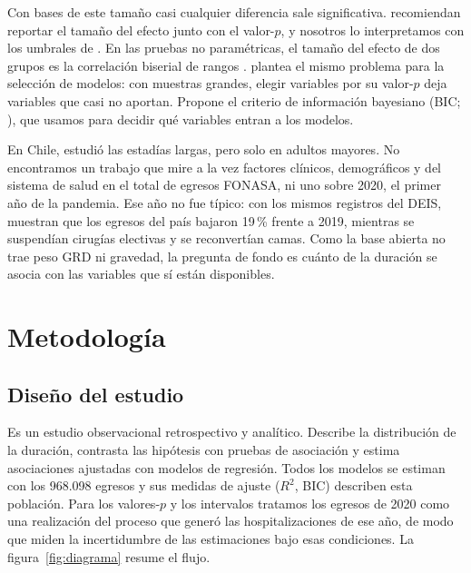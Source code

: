 \documentclass[10.5pt,a4paper,headings=small,abstract=false,bibliography=totoc,listof=totoc]{scrartcl}
\newcommand{\pct}{\,\%}
\begin{document}
Con bases de este tamaño casi cualquier diferencia sale significativa. \citet{lin2013} recomiendan reportar el tamaño del efecto junto con el valor-$p$, y nosotros lo interpretamos con los umbrales de \citet{cohen1988}. En las pruebas no paramétricas, el tamaño del efecto de dos grupos es la correlación biserial de rangos \citep{kerby2014}. \citet{raftery1995} plantea el mismo problema para la selección de modelos: con muestras grandes, elegir variables por su valor-$p$ deja variables que casi no aportan. Propone el criterio de información bayesiano (BIC; \citealt{schwarz1978}), que usamos para decidir qué variables entran a los modelos.

En Chile, \citet{olivares2020} estudió las estadías largas, pero solo en adultos mayores. No encontramos un trabajo que mire a la vez factores clínicos, demográficos y del sistema de salud en el total de egresos FONASA, ni uno sobre 2020, el primer año de la pandemia. Ese año no fue típico: con los mismos registros del DEIS, \citet{barahona2021} muestran que los egresos del país bajaron 19\pct{} frente a 2019, mientras se suspendían cirugías electivas y se reconvertían camas. Como la base abierta no trae peso GRD ni gravedad, la pregunta de fondo es cuánto de la duración se asocia con las variables que sí están disponibles.

\section{Metodología}

\subsection{Diseño del estudio}

Es un estudio observacional retrospectivo y analítico. Describe la distribución de la duración, contrasta las hipótesis con pruebas de asociación y estima asociaciones ajustadas con modelos de regresión. Todos los modelos se estiman con los 968.098 egresos y sus medidas de ajuste ($R^2$, BIC) describen esta población. Para los valores-$p$ y los intervalos tratamos los egresos de 2020 como una realización del proceso que generó las hospitalizaciones de ese año, de modo que miden la incertidumbre de las estimaciones bajo esas condiciones. La figura~\ref{fig:diagrama} resume el flujo.
\end{document}
